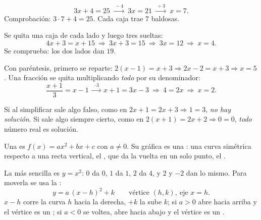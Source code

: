 \documentclass[11pt,a4paper]{article}
\begin{document}
\begin{ejemplo}
\[ 3x+4=25\ \xrightarrow{\ -4\ }\ 3x=21\ \xrightarrow{\ \div3\ }\ x=7 . \]
Comprobación: $3\cdot7+4=25$. Cada caja trae $7$ baldosas.
\end{ejemplo}
\begin{ejemplo}[Cajas en los dos lados: $4x+3=x+15$]
Se quita una caja de cada lado y luego tres sueltas:
\[ 4x+3=x+15\ \Rightarrow\ 3x+3=15\ \Rightarrow\ 3x=12\ \Rightarrow\ x=4 . \]
Se comprueba: los dos lados dan $19$.
\end{ejemplo}
\begin{ejemplo}
Con paréntesis, primero se reparte: $2(x-1)=x+3\Rightarrow 2x-2=x+3\Rightarrow x=5$.
Una fracción se quita multiplicando \emph{todo} por su denominador:
\[ \frac{x+1}{3}=x-1\ \xrightarrow{\ \cdot 3\ }\ x+1=3x-3\ \Rightarrow\ 4=2x\ \Rightarrow\ x=2 . \]
\end{ejemplo}
\begin{ojo}
Si al simplificar sale algo falso, como en $2x+1=2x+3\Rightarrow 1=3$, \emph{no hay solución}. Si sale algo siempre
cierto, como en $2(x+1)=2x+2\Rightarrow 0=0$, \emph{todo} número real es solución.
\end{ojo}


\begin{definicion}
Una  es $f(x)=ax^2+bx+c$ con $a\neq0$. Su gráfica es una : una curva
simétrica respecto a una recta vertical, el , que da la vuelta en un solo punto, el .
\end{definicion}
La más sencilla es $y=x^2$: $0$ da $0$, $1$ da $1$, $2$ da $4$, y $2$ y $-2$ dan lo mismo. Para moverla se usa la
:
\[ y=a\,(x-h)^2+k\qquad\text{vértice } (h,k),\ \text{eje } x=h . \]
$x-h$ corre la curva $h$ hacia la derecha, $+k$ la sube $k$; si $a>0$ abre hacia arriba y el vértice es un
; si $a<0$ se voltea, abre hacia abajo y el vértice es un .
\end{document}
